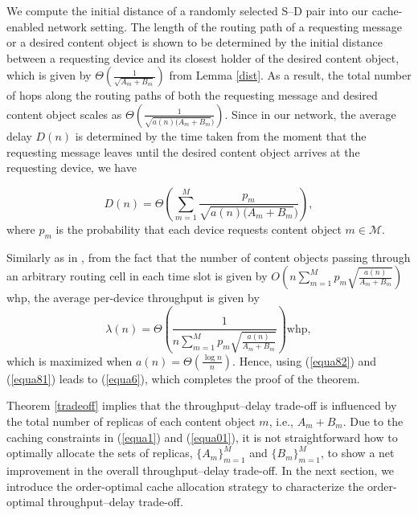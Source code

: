 \documentclass[10pt,journal,compsoc,onecolumn]{IEEEtran}
\begin{document}
\begin{IEEEproof}
We compute the initial distance
of a randomly selected S--D pair into our cache-enabled network
setting. The length of the routing path of a requesting
message or a desired content object is shown to be determined by
the initial distance between a requesting device and its closest
holder of the desired content object, which is given by
$\Theta\left(\frac{1}{\sqrt{A_m+B_m}}\right)$ from Lemma
\ref{dist}.
As a result, the total number of hops along the routing paths of both the requesting message and desired content object scales as $\Theta\left(\frac{1}{\sqrt{a(n)(A_m+B_m})}\right)$. Since in our network, the average delay $D(n)$ is determined by the time taken from the moment that the requesting message leaves until the desired content object arrives at the requesting device, we have

\begin{equation}
\label{equa82}
D(n)=\Theta\left(\sum^{M}_{m=1}   \frac{p_m}{\sqrt{a(n)(A_m+B_m})}\right),
\end{equation}
where $p_m$ is the probability that each device requests content object $m \in \mathcal{M}$.\par
Similarly as in \cite{c1}, from the fact that the number of content objects passing through an arbitrary routing cell in each time slot is given by
 $O\left(n\sum^{M}_{m=1} p_m  \sqrt{\frac{a(n)}{A_m+B_m}}\right)$ whp,
the average per-device throughput is given by
\begin{equation}
\label{equa81}
\lambda(n)= \Theta\left(\frac{1}{n\sum^{M}_{m=1} p_m  \sqrt{\frac{a(n)}{A_m+B_m}}}\right)\text{whp},
\end{equation}
which is maximized when $a(n)=\Theta\left(\frac{\log n}{n}\right)$. Hence, using (\ref{equa82}) and (\ref{equa81}) leads to (\ref{equa6}), which completes the proof of the theorem.
\end{IEEEproof}

Theorem \ref{tradeoff} implies that the throughput--delay
trade-off is influenced by the total number of replicas of each
content object $m$, i.e., $A_m+B_m$. Due to the caching
constraints in (\ref{equa1}) and (\ref{equa01}), it is not
straightforward how to optimally allocate the sets of replicas,
${\lbrace A_m \rbrace}^M_{m=1}$ and ${\lbrace B_m
\rbrace}^M_{m=1}$, to show a net improvement in the overall
throughput--delay trade-off. In the next section, we introduce the
order-optimal cache allocation strategy to characterize the order-optimal
throughput--delay trade-off.
\end{document}
